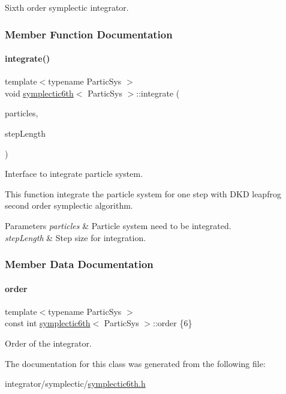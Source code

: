 Sixth order symplectic integrator. 

\subsubsection{Member Function Documentation}
\mbox{\label{classsymplectic6th_a204014a9214f444e23a1a75cbbae2b86}} 
\paragraph{\texorpdfstring{integrate()}{integrate()}}
{\footnotesize\ttfamily template$<$typename Partic\+Sys $>$ \\
void \mbox{\hyperlink{classsymplectic6th}{symplectic6th}}$<$ Partic\+Sys $>$\+::integrate (\begin{DoxyParamCaption}\item[{Partic\+Sys \&}]{particles,  }\item[{double}]{step\+Length }\end{DoxyParamCaption})\hspace{0.3cm}{\ttfamily [private]}}



Interface to integrate particle system. 

This function integrate the particle system for one step with D\+KD leapfrog second order symplectic algorithm. 
\begin{DoxyParams}{Parameters}
{\em particles} & Particle system need to be integrated. \\
\hline
{\em step\+Length} & Step size for integration. \\
\hline
\end{DoxyParams}


\subsubsection{Member Data Documentation}
\mbox{\label{classsymplectic6th_a7f4232a8639d27aeb0890476176e8553}} 
\paragraph{\texorpdfstring{order}{order}}
{\footnotesize\ttfamily template$<$typename Partic\+Sys $>$ \\
const int \mbox{\hyperlink{classsymplectic6th}{symplectic6th}}$<$ Partic\+Sys $>$\+::order \{6\}\hspace{0.3cm}{\ttfamily [static]}}



Order of the integrator. 



The documentation for this class was generated from the following file\+:\begin{DoxyCompactItemize}
\item 
integrator/symplectic/\mbox{\hyperlink{symplectic6th_8h}{symplectic6th.\+h}}\end{DoxyCompactItemize}
